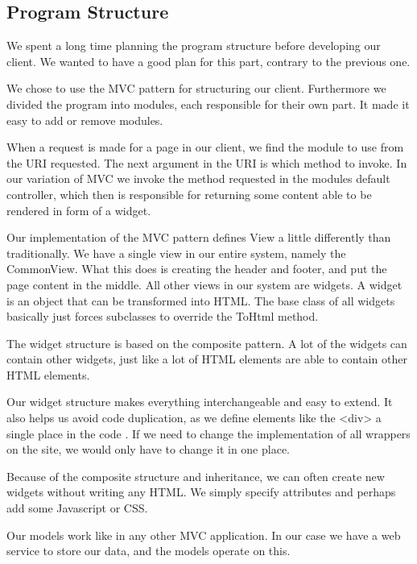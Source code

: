 \subsection{Program Structure}
We spent a long time planning the program structure before developing our client. We wanted to have a good plan for this part, contrary to the previous one.

We chose to use the MVC pattern for structuring our client.
Furthermore we divided the program into modules, each responsible for their own part. It made it easy to add or remove modules.

When a request is made for a page in our client, we find the module to use from the URI requested.
The next argument in the URI is which method to invoke. In our variation of MVC we invoke the method requested in the modules default controller, which then is responsible for returning some content able to be rendered in form of a widget.

Our implementation of the MVC pattern defines View a little differently than traditionally.
We have a single view in our entire system, namely the CommonView.
What this does is creating the header and footer, and put the page content in the middle.
All other views in our system are widgets. A widget is an object that can be transformed into HTML.
The base class of all widgets basically just forces subclasses to override the ToHtml method.

The widget structure is based on the composite pattern. A lot of the widgets can contain other widgets, just like a lot of HTML elements are able to contain other HTML elements.

Our widget structure makes everything interchangeable and easy to extend. It also helps us avoid code duplication, as we define elements like the <div> a single place in the code . If we need to change the implementation of all wrappers on the site, we would only have to change it in one place.

Because of the composite structure and inheritance, we can often create new widgets without writing any HTML. We simply specify attributes and perhaps add some Javascript or CSS.

Our models work like in any other MVC application. In our case we have a web service to store our data, and the models operate on this.
\newpage
